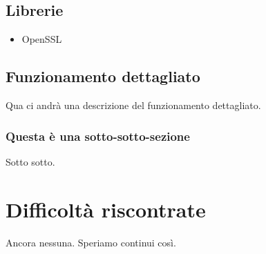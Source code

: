 \documentclass[a4paper, titlepage, 12pt]{article}
\begin{document}
\subsection{Librerie}
\begin{itemize}
    \item OpenSSL
\end{itemize}

\subsection{Funzionamento dettagliato}

Qua ci andrà una descrizione del funzionamento dettagliato.

\subsubsection{Questa è una sotto-sotto-sezione}

Sotto sotto.

\section{Difficoltà riscontrate}

Ancora nessuna. Speriamo continui così.
\end{document}
